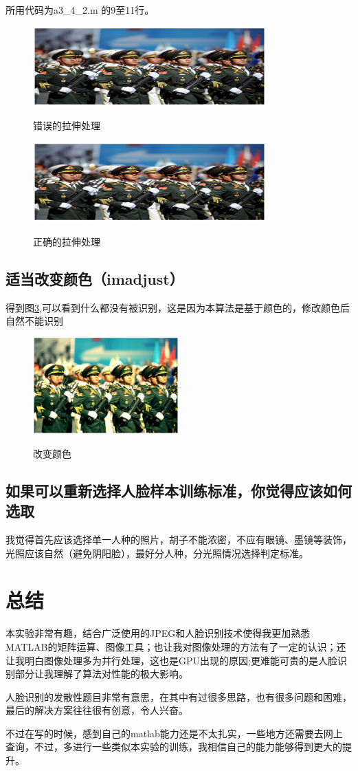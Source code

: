 \documentclass{ctexart}
\begin{document}
所用代码为a3\_4\_2.m 的9至11行。
\begin{figure}
    \centering
    \includegraphics[width=0.8\textwidth]{pic/ex2_resize.jpg}\\
    \caption{错误的拉伸处理\label{a343bwrong}}
\end{figure}
\begin{figure}
    \centering
    \includegraphics[width=0.8\textwidth]{pic/ex2_resize_correct.jpg}\\
    \caption{正确的拉伸处理\label{a343bcorrect}}
\end{figure}
\subsection{适当改变颜色（imadjust）}
得到图\ref{a343c},可以看到什么都没有被识别，这是因为本算法是基于颜色的，修改颜色后自然不能识别
\begin{figure}
    \centering
    \includegraphics[width=0.5\textwidth]{pic/ex2_ad.jpg}\\
    \caption{改变颜色\label{a343c}}
\end{figure}
\subsection{如果可以重新选择人脸样本训练标准，你觉得应该如何选取}
我觉得首先应该选择单一人种的照片，胡子不能浓密，不应有眼镜、墨镜等装饰，光照应该自然（避免阴阳脸），最好分人种，分光照情况选择判定标准。
\section{总结}
本实验非常有趣，结合广泛使用的JPEG和人脸识别技术使得我更加熟悉MATLAB的矩阵运算、图像工具；也让我对图像处理的方法有了一定的认识；还让我明白图像处理多为并行处理，这也是GPU出现的原因;更难能可贵的是人脸识别部分让我理解了算法对性能的极大影响。

人脸识别的发散性题目非常有意思，在其中有过很多思路，也有很多问题和困难，最后的解决方案往往很有创意，令人兴奋。

不过在写的时候，感到自己的matlab能力还是不太扎实，一些地方还需要去网上查询，不过，多进行一些类似本实验的训练，我相信自己的能力能够得到更大的提升。
\end{document}
